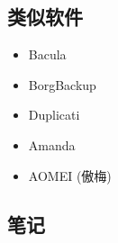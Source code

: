 
\begin{issues}
\issueDraft
\end{issues}

\subsection{类似软件}
\begin{itemize}
\item Bacula
\item BorgBackup 
\item Duplicati
\item Amanda
\item AOMEI (傲梅)
\end{itemize}

\subsection{笔记}
